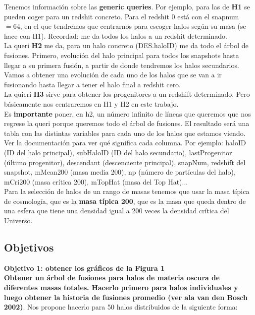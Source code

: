 \documentclass[8pt, a4paper]{article} %
\begin{document}
Tenemos información sobre las \textbf{generic queries}. Por ejemplo, para las de \textbf{H1} se pueden coger para un redshit concreto. Para el redshit 0 está con el snapnum$=64$, en el que tendremos que centrarnos para escoger halos según su masa (se hace con H1). Recordad: me da todos los halos a un redshit determinado. \\

La queri \textbf{H2} me da, para un halo concreto (DES.haloID) me da todo el árbol de fusiones. Primero, evolución del halo principal para todos los snapshots hasta llegar a su primera fusión, a partir de donde tendremos los halos secundarios. Vamos a obtener una evolución de cada uno de los halos que se van a ir fusionando hasta llegar a tener el halo final a redshit cero. \\

La quieri \textbf{H3} sirve para obtener los progenitores a un redshift determinado. Pero básicamente nos centraremos en H1 y H2 en este trabajo. \\

Es \textbf{importante} poner, en h2, un número infinito de líneas que queremos que nos regrese la queri porque queremos todo el árbol de fusiones. El resultado será una tabla con las distintas variables para cada uno de los halos que estamos viendo. Ver la documentación para ver qué significa cada columna. Por ejemplo: haloID (ID del halo principal), subHaloID (ID del halo secundario), lastProgenitor (último progenitor), descendant (descenciente principal), snapNum, redshift del snapshot, mMean200 (masa media 200), np (número de partículas del halo), mCri200 (masa crítica 200), mTopHat (masa del Top Hat)... \\

Para la selección de halos de un rango de masas tenemos que usar la masa típica de cosmología, que es la \textbf{masa típica 200}, que es la masa que queda dentro de una esfera que tiene una densidad igual a 200 veces la densidad crítica del Universo. \\

\newpage
\subsection{Objetivos}

\textbf{Objetivo 1: obtener los gráficos de la Figura 1}\\ 

\textbf{Obtener un árbol de fusiones para halos de materia oscura de diferentes masas totales. Hacerlo primero para halos individuales y luego obtener la historia de fusiones promedio (ver ala van den Bosch 2002)}. Nos propone hacerlo para 50 halos distribuidos de la siguiente forma: 
\end{document}
